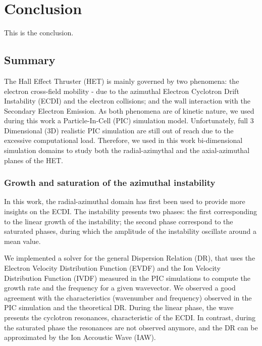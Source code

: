 
\chapter{Conclusion}
\label{ch-conclusion}


This is the conclusion.


\section{Summary}

The Hall Effect Thruster (HET) is mainly governed by two phenomena\string: the electron cross-field mobility - due to the azimuthal Electron Cyclotron Drift Instability (ECDI) and the electron collisions; and the wall interaction with the Secondary Electron Emission.
As both phenomena are of kinetic nature, we used during this work a Particle-In-Cell (PIC) simulation model.
Unfortunately, full 3 Dimensional (3D) realistic PIC simulation are still out of reach due to the excessive computational load.
Therefore, we used in this work bi-dimensional simulation domains to study both the radial-azimythal and the axial-azimuthal planes of the HET.

\subsection{Growth and saturation of the azimuthal instability}

In this work, the radial-azimuthal domain has first been used to provide more insights on the \ac{ECDI}.
The instability presents two phases\string: the first corresponding to the linear growth of the instability; the second phase correspond to the saturated phases, during which the amplitude of the instability oscillate around a mean value.

We implemented a solver for the general Dispersion Relation (DR), that uses the Electron Velocity Distribution Function (EVDF) and the Ion Velocity Distribution Function (IVDF) measured in the PIC simulations to compute the growth rate and the frequency for a given wavevector.
We observed a good agreement with the characteristics (wavenumber and frequency) observed in the \ac{PIC} simulation and the theoretical DR.
During the linear phase, the wave presents the cyclotron resonances, characteristic of the ECDI.
In contrast, during the saturated phase the resonances are not observed anymore, and the DR can be approximated by the Ion Accoustic Wave (IAW).

